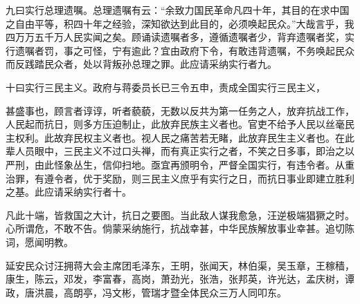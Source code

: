 九曰实行总理遗嘱。总理遗嘱有云：“余致力国民革命凡四十年，其目的在求中国之自由平等，积四十年之经验，深知欲达到此目的，必须唤起民众。”大哉言乎，我四万万五千万人民实闻之矣。顾诵读遗嘱者多，遵循遗嘱者少，背弃遗嘱者奖，实行遗嘱者罚，事之可怪，宁有逾此？宜由政府下令，有敢违背遗嘱，不务唤起民众而反践踏民众者，处以背叛孙总理之罪。此应请采纳实行者九。

十曰实行三民主义。政府与蒋委员长已三令五申，责成全国实行三民主义，

甚盛事也，顾言者谆谆，听者藐藐，无数以反共为第一任务之人，放弃抗战工作，人民起而抗日，则多方压迫制止，此放弃民族主义者也。官吏不给予人民以丝毫民主权利。此故弃民权主义者也。视人民之痛苦若无睹，此放弃民生主义者也。在此辈人员眼中，三民主义不过口头禅，而有真正实行之者，不笑之日多事，即治之以严刑，由此怪象丛生，信仰扫地。亟宜再颁明令，严督全国实行，有违令者。从重治罪，有遵令者，优于奖励，则三民主义庶乎有实行之日，而抗日事业即建立胜利之基。此应请采纳实行者十。

凡此十端，皆救国之大计，抗日之要图。当此敌人谋我愈急，汪逆极端猖獗之时。心所谓危，不敢不告。倘蒙采纳施行，抗战幸甚，中华民族解放事业幸甚。追切陈词，愿闻明教。

延安民众讨汪拥蒋大会主席团毛泽东，王明，张闻天，林伯渠，吴玉章，王稼穑，康生，陈云，邓发，李富春，高岗，萧劲光，张浩，张邦英，许光达，孟庆树，谭政，唐洪晨，高朗亭，冯文彬，管瑞才暨全体民众三万人同叩东。
